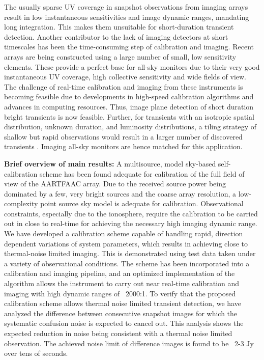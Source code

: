 \documentclass[referee]{aa}
\begin{document}
The  usually sparse  UV coverage  in snapshot  observations from  imaging arrays
result in  low instantaneous sensitivities  and image dynamic  ranges, mandating
long  integration.   This makes  them  unsuitable  for short-duration  transient
detection.   Another contributor  to  the  lack of  imaging  detectors at  short
timescales has been  the time-consuming step of calibration  and imaging. Recent
arrays  are being constructed  using a  large number  of small,  low sensitivity
elements. These  provide a perfect base  for all-sky monitors due  to their very
good instantaneous UV  coverage, high collective sensitivity and  wide fields of
view.  The challenge of real-time calibration and imaging from these instruments
is becoming  feasible due to  developments in high-speed  calibration algorithms
and  advances in  computing resources.   Thus,  image plane  detection of  short
duration  bright transients  is now  feasible. Further,  for transients  with an
isotropic spatial distribution,  unknown duration, and luminosity distributions,
a tiling  strategy of shallow  but rapid observations  would result in  a larger
number  of  discovered transients  \citep  {nemiroff2003tile}.  Imaging  all-sky
monitors are hence matched for this application.


\textbf{Brief  overview  of  main  results:}  A  multisource,  model  sky-based
self-calibration  scheme has  been found  adequate for  calibration of  the full
field of  view of the  AARTFAAC array.  Due  to the received source  power being
dominated by a few, very bright  sources and the coarse array resolution,
a  low-complexity   point  source  sky   model  is  adequate   for  calibration.
Observational  constraints,  especially  due   to  the  ionosphere,  require  the
calibration to be carried out in  close to real-time for achieving the necessary
high imaging dynamic  range.  We have developed a  calibration scheme capable of
handling  rapid,  direction dependent  variations  of  system parameters,  which
results  in  achieving   close  to  thermal-noise  limited   imaging.  This  is
demonstrated using test data taken  under a variety of observational conditions.
The scheme has been incorporated into a calibration and imaging pipeline, and an
optimized implementation  of the  algorithm allows the  instrument to  carry out
near real-time calibration and imaging  with high dynamic ranges of ~2000:1.  To
verify  that  the  proposed  calibration  scheme allows  thermal  noise  limited
transient  detection,  we  have  analyzed  the  difference  between  consecutive
snapshot images for  which the systematic confusion noise  is expected to cancel
out. This analysis shows the expected reduction in noise being consistent with a
thermal noise limited observation. The achieved noise limit of difference images
is found to be ~2-3 Jy over tens of seconds.
 
\end{document}
